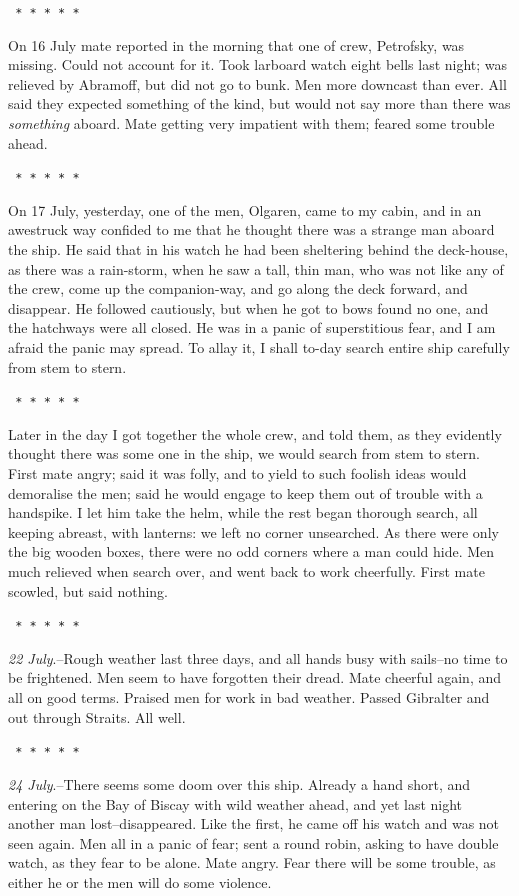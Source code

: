 \documentclass[12pt,openright]{book}
\begin{document}
\texttt{   *       *       *       *       *}

On 16 July mate reported in the morning that one of crew, Petrofsky, was missing. Could not account for it. Took larboard watch eight bells last night; was relieved by Abramoff, but did not go to bunk. Men more downcast than ever. All said they expected something of the kind, but would not say more than there was \textit{something} aboard. Mate getting very impatient with them; feared some trouble ahead.

\texttt{   *       *       *       *       *}

On 17 July, yesterday, one of the men, Olgaren, came to my cabin, and in an awestruck way confided to me that he thought there was a strange man aboard the ship. He said that in his watch he had been sheltering behind the deck-house, as there was a rain-storm, when he saw a tall, thin man, who was not like any of the crew, come up the companion-way, and go along the deck forward, and disappear. He followed cautiously, but when he got to bows found no one, and the hatchways were all closed. He was in a panic of superstitious fear, and I am afraid the panic may spread. To allay it, I shall to-day search entire ship carefully from stem to stern.

\texttt{   *       *       *       *       *}

Later in the day I got together the whole crew, and told them, as they evidently thought there was some one in the ship, we would search from stem to stern. First mate angry; said it was folly, and to yield to such foolish ideas would demoralise the men; said he would engage to keep them out of trouble with a handspike. I let him take the helm, while the rest began thorough search, all keeping abreast, with lanterns: we left no corner unsearched. As there were only the big wooden boxes, there were no odd corners where a man could hide. Men much relieved when search over, and went back to work cheerfully. First mate scowled, but said nothing.

\texttt{   *       *       *       *       *}

\textit{22 July}.–Rough weather last three days, and all hands busy with sails–no time to be frightened. Men seem to have forgotten their dread. Mate cheerful again, and all on good terms. Praised men for work in bad weather. Passed Gibralter and out through Straits. All well.

\texttt{   *       *       *       *       *}

\textit{24 July}.–There seems some doom over this ship. Already a hand short, and entering on the Bay of Biscay with wild weather ahead, and yet last night another man lost–disappeared. Like the first, he came off his watch and was not seen again. Men all in a panic of fear; sent a round robin, asking to have double watch, as they fear to be alone. Mate angry. Fear there will be some trouble, as either he or the men will do some violence.
\end{document}
